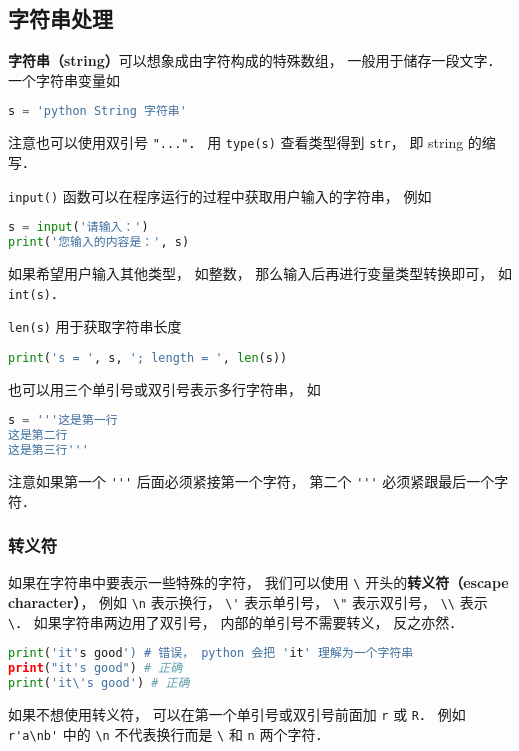 

\subsection{字符串处理}
\textbf{字符串（string）}可以想象成由字符构成的特殊数组， 一般用于储存一段文字． 一个字符串变量如
\begin{lstlisting}[language=python]
s = 'python String 字符串'
\end{lstlisting}
注意也可以使用双引号 \verb|"..."|． 用 \verb|type(s)| 查看类型得到 \verb|str|， 即 string 的缩写．

\verb|input()| 函数可以在程序运行的过程中获取用户输入的字符串， 例如
\begin{lstlisting}[language=python]
s = input('请输入：')
print('您输入的内容是：', s)
\end{lstlisting}
如果希望用户输入其他类型， 如整数， 那么输入后再进行变量类型转换即可， 如 \verb|int(s)|．

\verb|len(s)| 用于获取字符串长度
\begin{lstlisting}[language=python]
print('s = ', s, '; length = ', len(s))
\end{lstlisting}
也可以用三个单引号或双引号表示多行字符串， 如
\begin{lstlisting}[language=python]
s = '''这是第一行
这是第二行
这是第三行'''
\end{lstlisting}
注意如果第一个 \verb|'''| 后面必须紧接第一个字符， 第二个 \verb|'''| 必须紧跟最后一个字符．

\subsubsection{转义符}
如果在字符串中要表示一些特殊的字符， 我们可以使用 \verb|\| 开头的\textbf{转义符（escape character）}， 例如 \verb|\n| 表示换行， \verb|\'| 表示单引号， \verb|\"| 表示双引号， \verb|\\| 表示 \verb|\|． 如果字符串两边用了双引号， 内部的单引号不需要转义， 反之亦然．
\begin{lstlisting}[language=python]
print('it's good') # 错误， python 会把 'it' 理解为一个字符串
print("it's good") # 正确
print('it\'s good') # 正确
\end{lstlisting}

如果不想使用转义符， 可以在第一个单引号或双引号前面加 \verb|r| 或 \verb|R|． 例如 \verb|r'a\nb'| 中的 \verb|\n| 不代表换行而是 \verb|\| 和 \verb|n| 两个字符．

